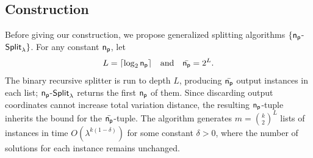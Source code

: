 %
\subsection{Construction}
\label{sec:tnike-con}
Before giving our construction, we propose generalized splitting algorithms $\{\mathsf{n_p}$-${\mathsf{Split}}_\lambda\}$. For any constant $\mathsf{n_p}$, let
\[
L=\lceil \log_2 \mathsf{n_p}\rceil
\quad\text{and}\quad
\bar{\mathsf{n_p}}=2^L .
\]
The binary recursive splitter is run to depth $L$, producing $\bar{\mathsf{n_p}}$ output instances in each list; $\mathsf{n_p}$-${\mathsf{Split}}_\lambda$ returns the first $\mathsf{n_p}$ of them. Since discarding output coordinates cannot increase total variation distance, the resulting $\mathsf{n_p}$-tuple inherits the bound for the $\bar{\mathsf{n_p}}$-tuple. The algorithm generates $m=\binom{k}{2}^{L}$ lists of instances in time $O(\lambda^{k(1-\delta)})$ for some constant $\delta > 0$, where the number of solutions for each instance remains unchanged.

